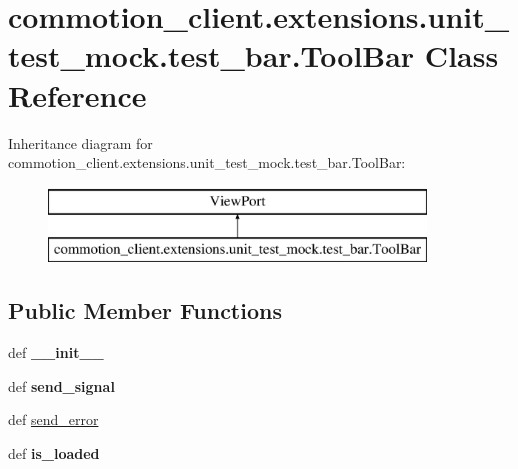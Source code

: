 \hypertarget{classcommotion__client_1_1extensions_1_1unit__test__mock_1_1test__bar_1_1ToolBar}{\section{commotion\-\_\-client.\-extensions.\-unit\-\_\-test\-\_\-mock.\-test\-\_\-bar.\-Tool\-Bar Class Reference}
\label{classcommotion__client_1_1extensions_1_1unit__test__mock_1_1test__bar_1_1ToolBar}
}
Inheritance diagram for commotion\-\_\-client.\-extensions.\-unit\-\_\-test\-\_\-mock.\-test\-\_\-bar.\-Tool\-Bar\-:\begin{figure}[H]
\begin{center}
\leavevmode
\includegraphics[height=2.000000cm]{classcommotion__client_1_1extensions_1_1unit__test__mock_1_1test__bar_1_1ToolBar}
\end{center}
\end{figure}
\subsection*{Public Member Functions}
\begin{DoxyCompactItemize}
\item 
\hypertarget{classcommotion__client_1_1extensions_1_1unit__test__mock_1_1test__bar_1_1ToolBar_a3b5b827110edea2c004ad18ac39c48c2}{def {\bfseries \-\_\-\-\_\-init\-\_\-\-\_\-}}\label{classcommotion__client_1_1extensions_1_1unit__test__mock_1_1test__bar_1_1ToolBar_a3b5b827110edea2c004ad18ac39c48c2}

\item 
\hypertarget{classcommotion__client_1_1extensions_1_1unit__test__mock_1_1test__bar_1_1ToolBar_a2590180f969a462b770cf5acadfdec89}{def {\bfseries send\-\_\-signal}}\label{classcommotion__client_1_1extensions_1_1unit__test__mock_1_1test__bar_1_1ToolBar_a2590180f969a462b770cf5acadfdec89}

\item 
def \hyperlink{classcommotion__client_1_1extensions_1_1unit__test__mock_1_1test__bar_1_1ToolBar_a88c0d36cbd949c0f9ded3423191b5af3}{send\-\_\-error}
\item 
\hypertarget{classcommotion__client_1_1extensions_1_1unit__test__mock_1_1test__bar_1_1ToolBar_a4c7d9655e04d923d46e5a8f4c230487d}{def {\bfseries is\-\_\-loaded}}\label{classcommotion__client_1_1extensions_1_1unit__test__mock_1_1test__bar_1_1ToolBar_a4c7d9655e04d923d46e5a8f4c230487d}

\end{DoxyCompactItemize}
